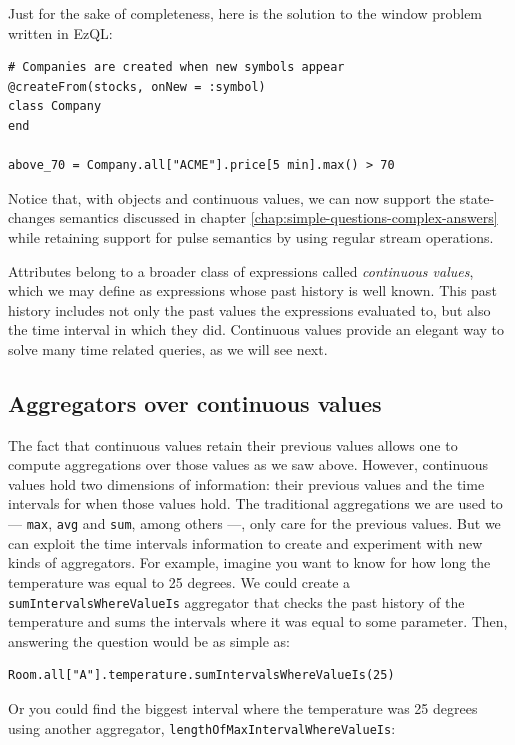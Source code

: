 \documentclass{report}
\begin{document}
Just for the sake of completeness, here is the solution to the window
problem written in EzQL:

\begin{verbatim}
# Companies are created when new symbols appear
@createFrom(stocks, onNew = :symbol)
class Company
end

above_70 = Company.all["ACME"].price[5 min].max() > 70
\end{verbatim}

Notice that, with objects and continuous values, we can now support
the state-changes semantics discussed in chapter
\ref{chap:simple-questions-complex-answers} while retaining support
for pulse semantics by using regular stream operations.

Attributes belong to a broader class of expressions called
\emph{continuous values}, which we may define as expressions whose
past history is well known. This past history includes not only the
past values the expressions evaluated to, but also the time interval
in which they did. Continuous values provide an elegant way to solve
many time related queries, as we will see next.

\subsection{Aggregators over continuous values}

The fact that continuous values retain their previous values allows
one to compute aggregations over those values as we saw
above. However, continuous values hold two dimensions of information:
their previous values and the time intervals for when those values
hold. The traditional aggregations we are used to --- \verb=max=,
\verb=avg= and \verb=sum=, among others ---, only care for the
previous values. But we can exploit the time intervals information to
create and experiment with new kinds of aggregators. For example,
imagine you want to know for how long the temperature was equal to 25
degrees. We could create a \verb=sumIntervalsWhereValueIs= aggregator
that checks the past history of the temperature and sums the intervals
where it was equal to some parameter. Then, answering the question
would be as simple as:

\begin{verbatim}
Room.all["A"].temperature.sumIntervalsWhereValueIs(25)
\end{verbatim}

Or you could find the biggest interval where the temperature was 25
degrees using another aggregator,
\verb=lengthOfMaxIntervalWhereValueIs=:
\end{document}
